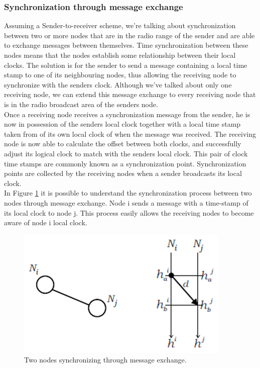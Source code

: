 \subsubsection{Synchronization through message exchange}
Assuming a Sender-to-receiver scheme, we're talking about synchronization between two or more nodes that are in the radio range of the sender and are able to exchange messages between themselves. Time synchronization between these nodes means that the nodes establish some relationship between their local clocks. The solution is for the sender to send a message containing a local time stamp to one of its neighbouring nodes, thus allowing the receiving node to synchronize with the senders clock. Although we've talked about only one receiving node, we can extend this message exchange to every receiving node that is in the radio broadcast area of the senders node.\\
Once a receiving node receives a synchronization message from the sender, he is now in possession of the senders local clock together with a local time stamp taken from of its own local clock of when the message was received. The receiving node is now able to calculate the offset between both clocks, and successfully adjust its logical clock to match with the senders local clock. This pair of  clock time stamps are commonly known as a synchronization point. Synchronization points are collected by the receiving nodes when a sender broadcasts its local clock.\\
In Figure \ref{syncmsg} it is possible to understand the synchronization process between two nodes through message exchange. Node i sends a message with a time-stamp of its local clock to node j. This process easily allows the receiving nodes to become aware of node i local clock.

\begin{figure}[!htb]
\begin{center}
\includegraphics[scale=0.8]{./images/24-ttsp-sync_msg.png}
\end{center}
\caption{Two nodes synchronizing through message exchange.}
\label{syncmsg}
\end{figure}

